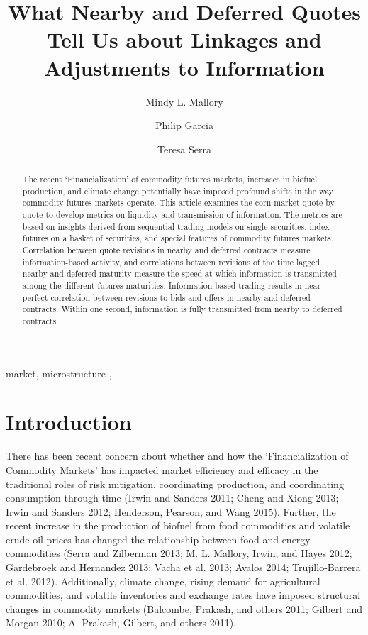 \documentclass[]{elsarticle} %
\begin{document}
\begin{frontmatter}

  \title{What Nearby and Deferred Quotes Tell Us about Linkages and Adjustments
to Information}
    \author[University of Illinois]{Mindy L. Mallory}
    \author[University of Illinois]{Philip Garcia}
  
    \author[University of Illinois]{Teresa Serra}
  
      \address[University of Illinois]{Agricultural and Consumer Economics, 1301 W Gregory Dr, Urbana, IL,
61801}
  
  \begin{abstract}
  The recent `Financialization' of commodity futures markets, increases in
  biofuel production, and climate change potentially have imposed profound
  shifts in the way commodity futures markets operate. This article
  examines the corn market quote-by-quote to develop metrics on liquidity
  and transmission of information. The metrics are based on insights
  derived from sequential trading models on single securities, index
  futures on a basket of securities, and special features of commodity
  futures markets. Correlation between quote revisions in nearby and
  deferred contracts measure information-based activity, and correlations
  between revisions of the time lagged nearby and deferred maturity
  measure the speed at which information is transmitted among the
  different futures maturities. Information-based trading results in near
  perfect correlation between revisions to bids and offers in nearby and
  deferred contracts. Within one second, information is fully transmitted
  from nearby to deferred contracts.
  \end{abstract}
   \begin{keyword} market, microstructure \sep \end{keyword}
 \end{frontmatter}

\section{Introduction}\label{introduction}

There has been recent concern about whether and how the
`Financialization of Commodity Markets' has impacted market efficiency
and efficacy in the traditional roles of risk mitigation, coordinating
production, and coordinating consumption through time (Irwin and Sanders
2011; Cheng and Xiong 2013; Irwin and Sanders 2012; Henderson, Pearson,
and Wang 2015). Further, the recent increase in the production of
biofuel from food commodities and volatile crude oil prices has changed
the relationship between food and energy commodities (Serra and
Zilberman 2013; M. L. Mallory, Irwin, and Hayes 2012; Gardebroek and
Hernandez 2013; Vacha et al. 2013; Avalos 2014; Trujillo-Barrera et al.
2012). Additionally, climate change, rising demand for agricultural
commodities, and volatile inventories and exchange rates have imposed
structural changes in commodity markets (Balcombe, Prakash, and others
2011; Gilbert and Morgan 2010; A. Prakash, Gilbert, and others 2011).
\end{document}
